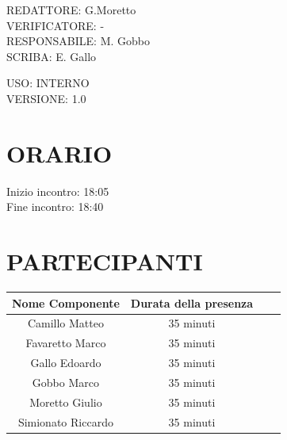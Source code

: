 \documentclass[5pt]{article}
\begin{document}
\vspace{13pt}

\begin{flushleft}
    \begin{spacing}{1.5}
        REDATTORE: G.Moretto \\
        VERIFICATORE:  - \\%
        RESPONSABILE: M. Gobbo\\%
        \vspace{7pt}
        SCRIBA: E. Gallo\\%
    \end{spacing}
\end{flushleft}

\begin{flushright}
    \begin{spacing}{1}
        USO: INTERNO\\
        VERSIONE: 1.0\\ %
    \end{spacing}
\end{flushright}


\restoregeometry

\pagebreak


\section{\Large ORARIO}
\begin{spacing}{1.5}
    {\large Inizio incontro: 18:05}\\
    {\large Fine incontro: 18:40}
\end{spacing}

\section{PARTECIPANTI}
\setlength\cellspacetoplimit{6pt}
\setlength\cellspacebottomlimit{6pt}

\begin{table}[ht]
  \begin{tabular}{|Sc|Sc|}
    \hline
    \textbf{Nome Componente} & \textbf{Durata della presenza} \\
    \hline
    Camillo Matteo & 35 minuti \\
    Favaretto Marco & 35 minuti \\
    Gallo Edoardo & 35 minuti \\
    Gobbo Marco & 35 minuti \\
    Moretto Giulio & 35 minuti \\
    Simionato Riccardo & 35 minuti \\
    \hline
  \end{tabular}
  \label{tab:conference}
\end{table}
\end{document}
